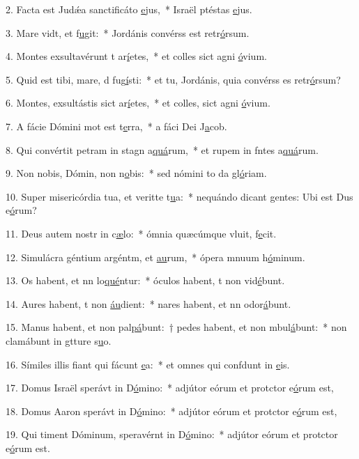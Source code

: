 2. Facta est Judǽa sanctificáto \uline{e}jus,~* Israël ptéstas \uline{e}jus.\par 
3. Mare vidt, et f\uline{u}git:~* Jordánis convérss est retr\uline{ó}rsum.\par 
4. Montes exsultavérunt t ar\uline{í}etes,~* et colles sict agni \uline{ó}vium.\par 
5. Quid est tibi, mare, d fug\uline{í}sti:~* et tu, Jordánis, quia convérss es retr\uline{ó}rsum?\par 
6. Montes, exsultástis sict ar\uline{í}etes,~* et colles, sict agni \uline{ó}vium.\par 
7. A fácie Dómini mot est t\uline{e}rra,~* a fáci Dei J\uline{a}cob.\par 
8. Qui convértit petram in stagn a\uline{quá}rum,~* et rupem in fntes a\uline{quá}rum.\par 
9. Non nobis, Dómin, non n\uline{o}bis:~* sed nómini to da gl\uline{ó}riam.\par 
10. Super misericórdia tua, et veritte t\uline{u}a:~* nequándo dicant gentes: Ubi est Dus e\uline{ó}rum?\par 
11. Deus autem nostr in c\uline{æ}lo:~* ómnia quæcúmque vluit, f\uline{e}cit.\par 
12. Simulácra géntium argéntm, et \uline{au}rum,~* ópera mnuum h\uline{ó}minum.\par 
13. Os habent, et nn lo\uline{qué}ntur:~* óculos habent, t non vid\uline{é}bunt.\par 
14. Aures habent, t non \uline{áu}dient:~* nares habent, et nn odor\uline{á}bunt.\par 
15. Manus habent, et non pal\uline{pá}bunt:~† pedes habent, et non mbul\uline{á}bunt:~* non clamábunt in gtture s\uline{u}o.\par 
16. Símiles illis fiant qui fácunt \uline{e}a:~* et omnes qui confdunt in \uline{e}is.\par 
17. Domus Israël sperávt in D\uline{ó}mino:~* adjútor eórum et protctor e\uline{ó}rum est,\par 
18. Domus Aaron sperávt in D\uline{ó}mino:~* adjútor eórum et protctor e\uline{ó}rum est,\par 
19. Qui timent Dóminum, speravérnt in D\uline{ó}mino:~* adjútor eórum et protctor e\uline{ó}rum est.\par 
